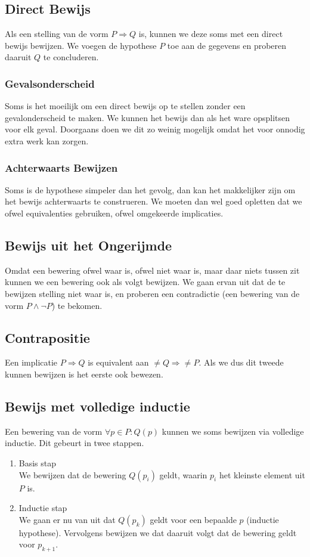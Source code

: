 \documentclass[lineaire_algebra_oplossingen.tex]{subfiles}
\begin{document}
\subsection{Direct Bewijs}
Als een stelling van de vorm $P \Rightarrow Q$ is, kunnen we deze soms met een direct bewijs bewijzen. We voegen de hypothese $P$ toe aan de gegevens en proberen daaruit $Q$ te concluderen. 

\subsubsection{Gevalsonderscheid}
Soms is het moeilijk om een direct bewijs op te stellen zonder een gevalonderscheid te maken. We kunnen het bewijs dan als het ware opsplitsen voor elk geval. Doorgaans doen we dit zo weinig mogelijk omdat het voor onnodig extra werk kan zorgen.

\subsubsection{Achterwaarts Bewijzen}
Soms is de hypothese simpeler dan het gevolg, dan kan het makkelijker zijn om het bewijs achterwaarts te construeren. We moeten dan wel goed opletten dat we ofwel equivalenties gebruiken, ofwel omgekeerde implicaties.

\subsection{Bewijs uit het Ongerijmde}
Omdat een bewering ofwel waar is, ofwel niet waar is, maar daar niets tussen zit kunnen we een bewering ook als volgt bewijzen. We gaan ervan uit dat de te bewijzen stelling niet waar is, en proberen een contradictie (een bewering van de vorm $P\wedge\neg P$) te bekomen.

\subsection{Contrapositie}
Een implicatie $P\Rightarrow Q$ is equivalent aan $\neq Q\Rightarrow \neq P$. Als we dus dit tweede kunnen bewijzen is het eerste ook bewezen.

\subsection{Bewijs met volledige inductie}
Een bewering van de vorm $\forall p \in P: Q(p)$ kunnen we soms bewijzen via volledige inductie. Dit gebeurt in twee stappen.
\begin{enumerate}
\item Basis stap\\
We bewijzen dat de bewering $Q(p_i)$ geldt, waarin $p_i$ het kleinste element uit $P$ is.
\item Inductie stap\\
We gaan er nu van uit dat $Q(p_k)$ geldt voor een bepaalde $p$ (inductie hypothese). Vervolgens bewijzen we dat daaruit volgt dat de bewering geldt voor $p_{k+1}$.
\end{enumerate}
\end{document}
